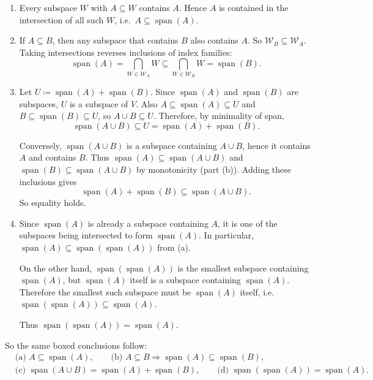 \documentclass[12pt]{article}
\newcommand{\Span}{\operatorname{span}}
\begin{document}
\begin{enumerate}[label=(\alph*)]
\item Every subspace \(W\) with \(A\subseteq W\) contains \(A\).
Hence \(A\) is contained in the intersection of all such \(W\), i.e.\ \(A\subseteq \Span(A)\).

\item If \(A\subseteq B\), then any subspace that contains \(B\) also contains \(A\).
So \(\mathcal{W}_B\subseteq \mathcal{W}_A\).
Taking intersections reverses inclusions of index families:
\[
\Span(A)=\bigcap_{W\in\mathcal{W}_A}W \subseteq \bigcap_{W\in\mathcal{W}_B}W=\Span(B).
\]

\item Let \(U\coloneqq \Span(A)+\Span(B)\).
Since \(\Span(A)\) and \(\Span(B)\) are subspaces, \(U\) is a subspace of \(V\).
Also \(A\subseteq \Span(A)\subseteq U\) and \(B\subseteq \Span(B)\subseteq U\), so \(A\cup B\subseteq U\).
Therefore, by minimality of span,
\[
\Span(A\cup B)\subseteq U=\Span(A)+\Span(B).
\]

Conversely, \(\Span(A\cup B)\) is a subspace containing \(A\cup B\), hence it contains \(A\) and contains \(B\).
Thus \(\Span(A)\subseteq \Span(A\cup B)\) and \(\Span(B)\subseteq \Span(A\cup B)\) by monotonicity (part (b)).
Adding these inclusions gives
\[
\Span(A)+\Span(B)\subseteq \Span(A\cup B).
\]
So equality holds.

\item Since \(\Span(A)\) is already a subspace containing \(A\), it is one of the subspaces being intersected to form \(\Span(A)\).
In particular, \(\Span(A)\subseteq \Span(\Span(A))\) from (a).

On the other hand, \(\Span(\Span(A))\) is the smallest subspace containing \(\Span(A)\), but \(\Span(A)\) itself is a subspace containing \(\Span(A)\).
Therefore the smallest such subspace must be \(\Span(A)\) itself, i.e.\ \(\Span(\Span(A))\subseteq \Span(A)\).

Thus \(\Span(\Span(A))=\Span(A)\).
\end{enumerate}

So the same boxed conclusions follow:
\[
\boxed{
\begin{aligned}
&\text{(a) }A\subseteq \Span(A),\qquad
\text{(b) }A\subseteq B\Rightarrow \Span(A)\subseteq \Span(B),\\
&\text{(c) }\Span(A\cup B)=\Span(A)+\Span(B),\qquad
\text{(d) }\Span(\Span(A))=\Span(A).
\end{aligned}}
\]

\newpage
\end{document}

